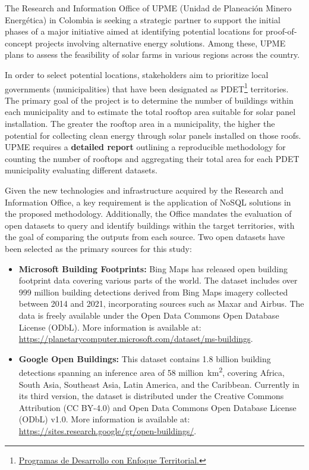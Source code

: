 \documentclass[11pt]{article}
\begin{document}
The Research and Information Office of UPME (Unidad de Planeación Minero Energética) in Colombia is seeking a strategic partner to support the initial phases of a major initiative aimed at identifying potential locations for proof-of-concept projects involving alternative energy solutions. Among these, UPME plans to assess the feasibility of solar farms in various regions across the country.

In order to select potential locations, stakeholders aim to prioritize local governments (municipalities) that have been designated as PDET\footnote{\href{https://centralpdet.renovacionterritorio.gov.co/conoce-los-pdet/}{Programas de Desarrollo con Enfoque Territorial.}} territories. The primary goal of the project is to determine the number of buildings within each municipality and to estimate the total rooftop area suitable for solar panel installation. The greater the rooftop area in a municipality, the higher the potential for collecting clean energy through solar panels installed on those roofs. UPME requires a \textbf{detailed report} outlining a reproducible methodology for counting the number of rooftops and aggregating their total area for each PDET municipality evaluating different datasets.

Given the new technologies and infrastructure acquired by the Research and Information Office, a key requirement is the application of NoSQL solutions in the proposed methodology. Additionally, the Office mandates the evaluation of open datasets to query and identify buildings within the target territories, with the goal of comparing the outputs from each source. Two open datasets have been selected as the primary sources for this study:

\begin{itemize}
  \item \textbf{Microsoft Building Footprints:} Bing Maps has released open building footprint data covering various parts of the world. The dataset includes over 999 million building detections derived from Bing Maps imagery collected between 2014 and 2021, incorporating sources such as Maxar and Airbus. The data is freely available under the Open Data Commons Open Database License (ODbL). More information is available at: \url{https://planetarycomputer.microsoft.com/dataset/ms-buildings}.

  \item \textbf{Google Open Buildings:} This dataset contains 1.8 billion building detections spanning an inference area of 58 million~km\textsuperscript{2}, covering Africa, South Asia, Southeast Asia, Latin America, and the Caribbean. Currently in its third version, the dataset is distributed under the Creative Commons Attribution (CC BY-4.0) and Open Data Commons Open Database License (ODbL) v1.0. More information is available at: \url{https://sites.research.google/gr/open-buildings/}.
\end{itemize}
\end{document}
